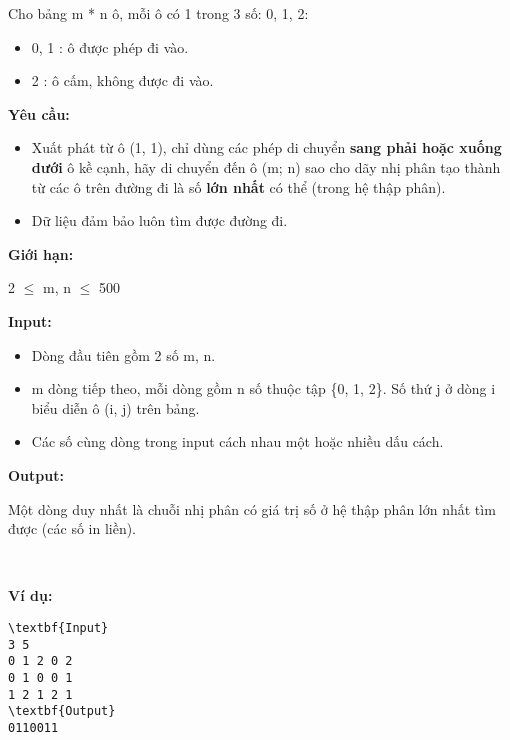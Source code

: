 

Cho bảng m * n ô, mỗi ô có 1 trong 3 số: 0, 1, 2:
\begin{itemize}
	\item 0, 1 : ô được phép đi vào.
	\item 2 : ô cấm, không được đi vào.
\end{itemize}

\textbf{Yêu cầu: }\textbf{}
\begin{itemize}
	\item Xuất phát từ ô (1, 1), chỉ dùng các phép di chuyển \textbf{ sang phải hoặc xuống dưới } ô kề cạnh, hãy di chuyển đến ô (m; n) sao cho dãy nhị phân tạo thành từ các ô trên đường đi là số \textbf{ lớn nhất } có thể (trong hệ thập phân).
	\item Dữ liệu đảm bảo luôn tìm được đường đi.
\end{itemize}

\textbf{Giới hạn: }

2  $\le$  m, n  $\le$  500




\textbf{Input: }\textbf{}
\begin{itemize}
	\item Dòng đầu tiên gồm 2 số m, n.
	\item m dòng tiếp theo, mỗi dòng gồm n số thuộc tập \{0, 1, 2\}. Số thứ j ở dòng i biểu diễn ô (i, j) trên bảng.
	\item Các số cùng dòng trong input cách nhau một hoặc nhiều dấu cách.
\end{itemize}

\textbf{Output: }

Một dòng duy nhất là chuỗi nhị phân có giá trị số ở hệ thập phân lớn nhất tìm được (các số in liền).

 

\textbf{Ví dụ: }\textbf{}
\begin{verbatim}
\textbf{Input}
3 5
0 1 2 0 2
0 1 0 0 1
1 2 1 2 1
\textbf{Output}
0110011\end{verbatim}
